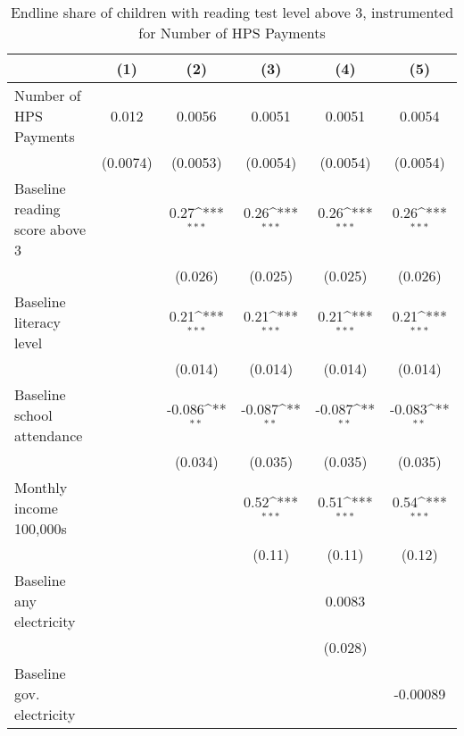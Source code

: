 \begin{table}[htbp]\centering
\def\sym#1{\ifmmode^{#1}\else\(^{#1}\)\fi}
\caption{Endline share of children with reading test level above 3, instrumented for Number of HPS Payments}
\begin{tabular*}{1\hsize}{@{\hskip\tabcolsep\extracolsep\fill}l*{5}{c}}
\toprule
                &\multicolumn{1}{c}{(1)}         &\multicolumn{1}{c}{(2)}         &\multicolumn{1}{c}{(3)}         &\multicolumn{1}{c}{(4)}         &\multicolumn{1}{c}{(5)}         \\
\midrule
Number of HPS Payments&    0.012         &   0.0056         &   0.0051         &   0.0051         &   0.0054         \\
                & (0.0074)         & (0.0053)         & (0.0054)         & (0.0054)         & (0.0054)         \\
Baseline reading score above 3&                  &     0.27\sym{***}&     0.26\sym{***}&     0.26\sym{***}&     0.26\sym{***}\\
                &                  &  (0.026)         &  (0.025)         &  (0.025)         &  (0.026)         \\
Baseline literacy level&                  &     0.21\sym{***}&     0.21\sym{***}&     0.21\sym{***}&     0.21\sym{***}\\
                &                  &  (0.014)         &  (0.014)         &  (0.014)         &  (0.014)         \\
Baseline school attendance&                  &   -0.086\sym{**} &   -0.087\sym{**} &   -0.087\sym{**} &   -0.083\sym{**} \\
                &                  &  (0.034)         &  (0.035)         &  (0.035)         &  (0.035)         \\
Monthly income 100,000s&                  &                  &     0.52\sym{***}&     0.51\sym{***}&     0.54\sym{***}\\
                &                  &                  &   (0.11)         &   (0.11)         &   (0.12)         \\
Baseline any electricity&                  &                  &                  &   0.0083         &                  \\
                &                  &                  &                  &  (0.028)         &                  \\
Baseline gov. electricity&                  &                  &                  &                  & -0.00089         \\

\end{tabular*}
\end{table}
